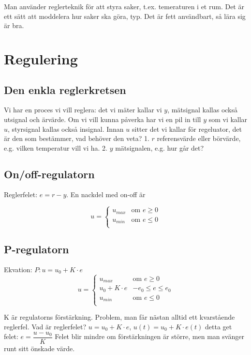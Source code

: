 \documentclass[12pt]{article} %
\begin{document}
Man använder reglerteknik för att styra saker, t.ex. temeraturen i et rum. Det är ett sätt att moddelera hur saker ska göra, typ. Det är fett användbart, så lära sig är bra.

\section{Regulering}

\subsection{Den enkla reglerkretsen}

Vi har en proces vi vill reglera: det vi mäter kallar vi $y$, mätsignal kallas också utsignal och ärvärde. Om vi vill kunna påverka har vi en pil in till $y$ som vi kallar $u$, styrsignal kallas också insignal. Innan $u$ sitter det vi kallar för regeluator, det är den som bestämmer, vad behöver den veta? 1. $r$ referensvärde eller börvärde, e.g. vilken temperatur vill vi ha. 2. $y$ mätsignalen, e.g. hur går det? 

\subsection{On/off-regulatorn}
Reglerfelet: $e = r -y$. En nackdel med on-off är 

\[
u =
    \begin{cases}
        u_{max} & \text{om } e \geq 0 \\
        u_{min} & \text{om } e \leq 0 \\ 
    \end{cases}
\]

\subsection{P-regulatorn}
Ekvation: $P: u = u_0 + K \cdot e$
\[
u =
    \begin{cases}
        u_{max} & \text{om } e \geq 0 \\
        u_0 + K \cdot e & -e_0 \leq e \leq e_0 \\
        u_{min} & \text{om } e \leq 0 \\ 
    \end{cases}
\]

K är regulatorns förstärkning. Problem, man får nästan alltid ett kvarstående reglerfel.
Vad är reglerfelet? $u = u_0 + K \cdot e$, $u(t) = u_0 + K \cdot e(t)$ detta get felet: $e = \dfrac{u - u_{0}}{K}$
Felet blir mindre om förstärkningen är större, men man svänger runt sitt önskade värde.
\end{document}
